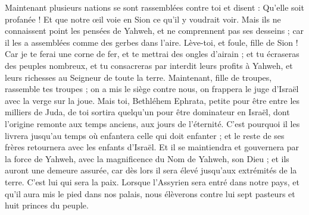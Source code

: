 \begin{multicols}{2}
Maintenant plusieurs nations se sont rassemblées contre toi et disent : Qu'elle soit profanée ! Et que notre œil voie en Sion ce qu’il y voudrait voir.
Mais ils ne connaissent point les pensées de Yahweh, et ne comprennent pas ses desseins ; car il les a assemblées comme des gerbes dans l'aire.
Lève-toi, et foule, fille de Sion ! Car je te ferai une corne de fer, et te mettrai des ongles d'airain ; et tu écraseras des peuples nombreux, et tu consacreras par interdit leurs profits à Yahweh, et leurs richesses au Seigneur de toute la terre.
Maintenant, fille de troupes, rassemble tes troupes ; on a mis le siège contre nous, on frappera le juge d'Israël avec la verge sur la joue.
\VerseOne{}Mais toi, Bethléhem Ephrata, petite pour être entre les milliers de Juda, de toi sortira quelqu’un pour être dominateur en Israël, dont l'origine remonte aux temps anciens, aux jours de l'éternité.
C'est pourquoi il les livrera jusqu'au temps où enfantera celle qui doit enfanter ; et le reste de ses frères retournera avec les enfants d'Israël.
Et il se maintiendra et gouvernera par la force de Yahweh, avec la magnificence du Nom de Yahweh, son Dieu ; et ils auront une demeure assurée, car dès lors il sera élevé jusqu'aux extrémités de la terre.
C'est lui qui sera la paix. Lorsque l'Assyrien sera entré dans notre pays, et qu'il aura mis le pied dans nos palais, nous élèverons contre lui sept pasteurs et huit princes du peuple.

\end{multicols}
